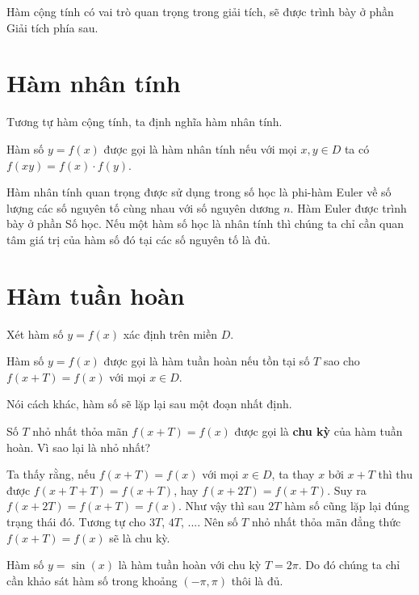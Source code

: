Hàm cộng tính có vai trò quan trọng trong giải tích, sẽ được trình bày
ở phần Giải tích phía sau.

\section{Hàm nhân tính}

Tương tự hàm cộng tính, ta định nghĩa hàm nhân tính.

\begin{definition}
    Hàm số $y = f(x)$ được gọi là hàm nhân tính nếu với mọi $x, y \in D$
    ta có $f(xy) = f(x) \cdot f(y)$.
\end{definition}

Hàm nhân tính quan trọng được sử dụng trong số học là phi-hàm Euler
về số lượng các số nguyên tố cùng nhau với số nguyên dương $n$. Hàm
Euler được trình bày ở phần Số học. Nếu một hàm số học là nhân tính
thì chúng ta chỉ cần quan tâm giá trị của hàm số đó tại các số nguyên
tố là đủ.

\section{Hàm tuần hoàn}

Xét hàm số $y=f(x)$ xác định trên miền $D$.

\begin{definition}
    Hàm số $y=f(x)$ được gọi là hàm tuần hoàn nếu tồn tại số $T$
    sao cho $f(x+T) = f(x)$ với mọi $x \in D$.
\end{definition}

Nói cách khác, hàm số sẽ lặp lại sau một đoạn nhất định.

Số $T$ nhỏ nhất thỏa mãn $f(x+T) = f(x)$ được gọi là \textbf{chu kỳ}
của hàm tuần hoàn. Vì sao lại là nhỏ nhất?

Ta thấy rằng, nếu $f(x+T) = f(x)$ với mọi $x \in D$, ta thay $x$ bởi
$x + T$ thì thu được $f(x + T + T) = f(x+T)$, hay $f(x+2T) = f(x+T)$.
Suy ra $f(x+2T) = f(x+T) = f(x)$. Như vậy thì sau $2T$ hàm số cũng
lặp lại đúng trạng thái đó. Tương tự cho $3T$, $4T$, .... Nên số $T$
nhỏ nhất thỏa mãn đẳng thức $f(x+T) = f(x)$ sẽ là chu kỳ.

\begin{example}
    Hàm số $y = \sin(x)$ là hàm tuần hoàn với chu kỳ $T = 2\pi$.
    Do đó chúng ta chỉ cần khảo sát hàm số trong khoảng $(-\pi, \pi)$
    thôi là đủ.
\end{example}